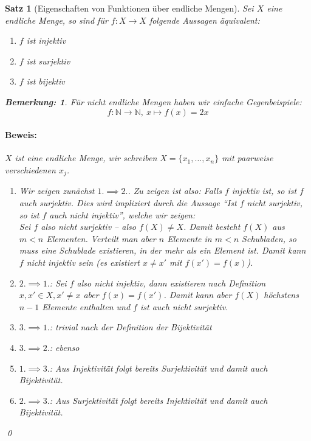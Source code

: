 \documentclass{report}
\newcommand{\N}{\mathbb{N}}
\theoremstyle{customrem}
\newtheorem*{bemerkung}{Bemerkung\textnormal:}
\theoremstyle{customdef}
\newtheorem{satz}[definition]{Satz}
\renewenvironment{proof}{\paragraph{Beweis: }}{\qed}
\begin{document}
	\begin{satz}[Eigenschaften von Funktionen über endliche Mengen]
		Sei \(X\) eine endliche Menge, so sind für \(f : X \to X\) folgende Aussagen äquivalent:
		\begin{enumerate}
			\itemsep0cm
			\item \(f\) ist injektiv 
			\item \(f\) ist surjektiv
			\item \(f\) ist bijektiv
		\end{enumerate}
		
		\begin{bemerkung}
			Für nicht endliche Mengen haben wir einfache Gegenbeispiele:
			\[f : \N \to \N,\ x \mapsto f(x) = 2x\]
		\end{bemerkung}
		
		\begin{proof}
			\(X\) ist eine endliche Menge, wir schreiben \(X = \{x_1, \dots, x_n\}\) mit paarweise verschiedenen \(x_j\).
			\begin{enumerate}
				\item[i)] Wir zeigen zunächst \(1. \implies 2.\). Zu zeigen ist also: Falls \(f\) injektiv ist, so ist \(f\) auch surjektiv. Dies wird impliziert durch die Aussage "`Ist \(f\) \textit{nicht} surjektiv, so ist \(f\) auch \textit{nicht} injektiv"', welche wir zeigen:\\
				Sei \(f\) also nicht surjektiv -- also \(f(X) \neq X\). Damit besteht \(f(X)\) aus \(m < n\) Elementen. Verteilt man aber \(n\) Elemente in \(m < n\) Schubladen, so muss eine Schublade existieren, in der mehr als ein Element ist. Damit kann \(f\) nicht injektiv sein (es existiert \(x \neq x'\) mit \(f(x') = f(x)\)).
				\item[ii)] \(2. \implies 1.\): Sei \(f\) also nicht injektiv, dann existieren nach Definition \(x, x' \in X, x' \neq x\) aber \(f(x) = f(x')\). Damit kann aber \(f(X)\) höchstens \(n-1\) Elemente enthalten und \(f\) ist auch nicht surjektiv.
				\item[iii)] \(3. \implies 1.\): trivial nach der Definition der Bijektivität
				\item[iv)] \(3. \implies 2.\): ebenso
				\item[v)] \(1. \implies 3.\): Aus Injektivität folgt bereits Surjektivität und damit auch Bijektivität.
				\item[vi)] \(2. \implies 3.\): Aus Surjektivität folgt bereits Injektivität und damit auch Bijektivität.
			\end{enumerate}
		\end{proof}
	\end{satz}
	
\end{document}
